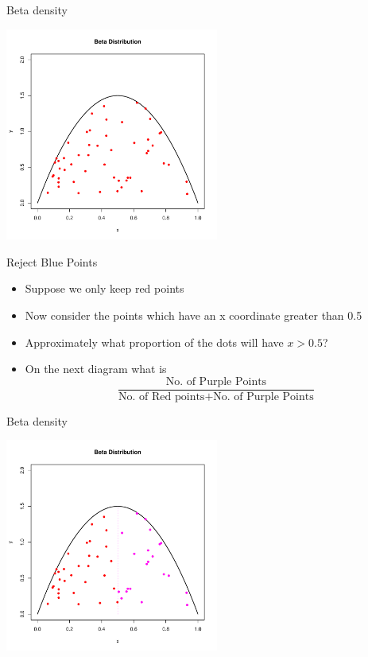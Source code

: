 \documentclass
[handout]
{beamer}
\begin{document}
\begin{frame}{Beta density}
\begin{center}
\includegraphics[height=7cm]{./Pics/bet4.pdf}
\end{center}
\end{frame}
\begin{frame}{Reject Blue Points}
\begin{itemize}
\item Suppose we only keep red points
\pause
\item Now consider the points which have an x coordinate greater than 0.5
\pause
\item Approximately what proportion of the dots will have $x>0.5$?
\pause
\item On the next diagram what is
\begin{equation}
\frac{\mbox{No. of Purple Points}}{\mbox{No. of Red points+No. of Purple Points}}
\end{equation}
\end{itemize}
\end{frame}
\begin{frame}{Beta density}
\begin{center}
\includegraphics[height=7cm]{./Pics/bet5.pdf}
\end{center}
\end{frame}
\end{document}
